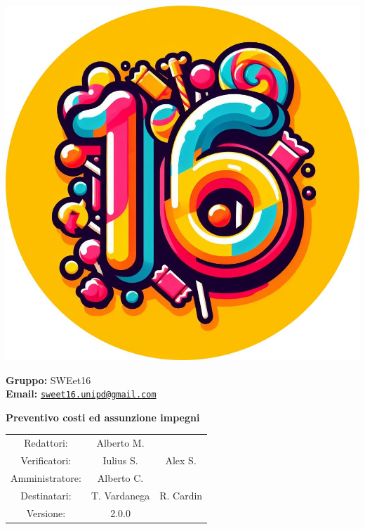 \documentclass[a4paper, 11pt]{article}
\begin{document}
\begin{minipage}{0.35\linewidth}
    \includegraphics[width=\linewidth]{logo rotondo.jpg}
\end{minipage}\hfil
\begin{minipage}{0.55\linewidth}
\textbf{Gruppo:} SWEet16 \\
\textbf{Email:} 
\href{mailto:sweet16.unipd@gmail.com}{\nolinkurl{sweet16.unipd@gmail.com}}
\end{minipage}

\vspace{15mm}

\begin{center}
\begin{Huge}
        \textbf{Preventivo costi ed assunzione impegni} \\
        \vspace{4mm}
        
\end{Huge}

\vspace{20mm}

\begin{large}
\begin{spacing}{1.4}
\begin{tabular}{c c c}
   Redattori:  &  Alberto M. & \\
   Verificatori: & Iulius S. & Alex S. \\
   Amministratore: & Alberto C. & \\
   Destinatari: & T. Vardanega & R. Cardin \\  
   Versione: & 2.0.0 & 
\end{tabular}
\end{spacing}
\end{large}
\end{center}
\end{document}

